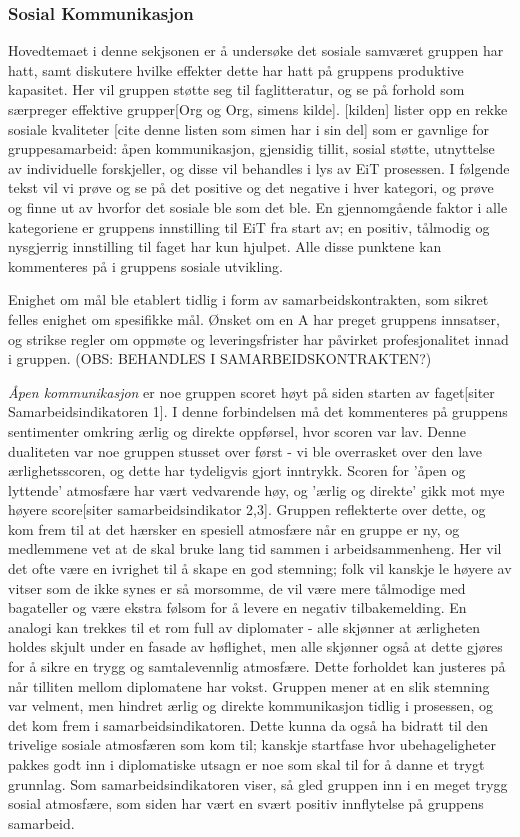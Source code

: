 \subsubsection{Sosial Kommunikasjon}

Hovedtemaet i denne sekjsonen er å undersøke det sosiale samværet gruppen har hatt, samt diskutere hvilke effekter dette har hatt på gruppens produktive kapasitet. Her vil gruppen støtte seg til faglitteratur, og se på forhold som særpreger effektive grupper[Org og Org, simens kilde]. [kilden] lister opp en rekke sosiale kvaliteter [cite denne listen som simen har i sin del] som er gavnlige for gruppesamarbeid:  åpen kommunikasjon, gjensidig tillit, sosial støtte, utnyttelse av individuelle forskjeller, og disse vil behandles i lys av EiT prosessen. I følgende tekst vil vi prøve og se på det positive og det negative i hver kategori, og prøve og finne ut av hvorfor det sosiale ble som det ble. En gjennomgående faktor i alle kategoriene er gruppens innstilling til EiT fra start av; en positiv, tålmodig og nysgjerrig innstilling til faget har kun hjulpet. Alle disse punktene kan kommenteres på i gruppens sosiale utvikling.
 
Enighet om mål ble etablert tidlig i form av samarbeidskontrakten, som sikret felles enighet om spesifikke mål. Ønsket om en A har preget gruppens innsatser, og strikse regler om oppmøte og leveringsfrister har påvirket profesjonalitet innad i gruppen. (OBS: BEHANDLES I SAMARBEIDSKONTRAKTEN?)

\emph{Åpen kommunikasjon} er noe gruppen scoret høyt på siden starten av faget[siter Samarbeidsindikatoren 1]. I denne forbindelsen må det kommenteres på gruppens sentimenter omkring ærlig og direkte oppførsel, hvor scoren var lav. Denne dualiteten var noe gruppen stusset over først - vi ble overrasket over den lave ærlighetsscoren, og dette har tydeligvis gjort inntrykk. Scoren for 'åpen og lyttende' atmosfære har vært vedvarende høy, og 'ærlig og direkte' gikk mot mye høyere score[siter samarbeidsindikator 2,3]. 
Gruppen reflekterte over dette, og kom frem til at det hærsker en spesiell atmosfære når en gruppe er ny, og medlemmene vet at de skal bruke lang tid sammen i arbeidsammenheng. Her vil det ofte være en ivrighet til å skape en god stemning; folk vil kanskje le høyere av vitser som de ikke synes er så morsomme, de vil være mere tålmodige med bagateller og være ekstra følsom for å levere en negativ tilbakemelding. En analogi kan trekkes til et rom full av diplomater - alle skjønner at ærligheten holdes skjult under en fasade av høflighet, men alle skjønner også at dette gjøres for å sikre en trygg og samtalevennlig atmosfære. Dette forholdet kan justeres på når tilliten mellom diplomatene har vokst. Gruppen mener at en slik stemning var velment, men hindret ærlig og direkte kommunikasjon tidlig i prosessen, og det kom frem i samarbeidsindikatoren.
Dette kunna da også ha bidratt til den trivelige sosiale atmosfæren som kom til; kanskje startfase hvor ubehageligheter pakkes godt inn i diplomatiske utsagn er noe som skal til for å danne et trygt grunnlag. Som samarbeidsindikatoren viser, så gled gruppen inn i en meget trygg sosial atmosfære, som siden har vært en svært positiv innflytelse på gruppens samarbeid.

